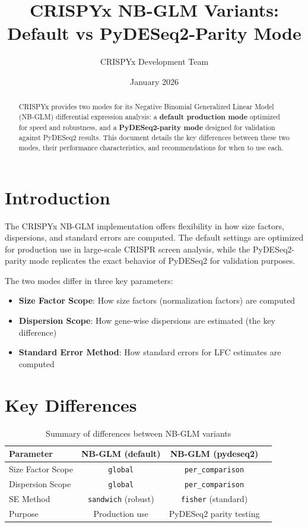 \documentclass{article}
\title{CRISPYx NB-GLM Variants: Default vs PyDESeq2-Parity Mode}
\author{CRISPYx Development Team}
\date{January 2026}
\begin{document}
\maketitle

\begin{abstract}
CRISPYx provides two modes for its Negative Binomial Generalized Linear Model (NB-GLM) differential expression analysis: a \textbf{default production mode} optimized for speed and robustness, and a \textbf{PyDESeq2-parity mode} designed for validation against PyDESeq2 results. This document details the key differences between these two modes, their performance characteristics, and recommendations for when to use each.
\end{abstract}

\section{Introduction}

The CRISPYx NB-GLM implementation offers flexibility in how size factors, dispersions, and standard errors are computed. The default settings are optimized for production use in large-scale CRISPR screen analysis, while the PyDESeq2-parity mode replicates the exact behavior of PyDESeq2 for validation purposes.

The two modes differ in three key parameters:
\begin{itemize}
    \item \textbf{Size Factor Scope}: How size factors (normalization factors) are computed
    \item \textbf{Dispersion Scope}: How gene-wise dispersions are estimated (the key difference)
    \item \textbf{Standard Error Method}: How standard errors for LFC estimates are computed
\end{itemize}

\section{Key Differences}

\begin{table}[h]
\centering
\caption{Summary of differences between NB-GLM variants}
\label{tab:summary}
\begin{tabular}{lccc}
\toprule
\textbf{Parameter} & \textbf{NB-GLM (default)} & \textbf{NB-GLM (pydeseq2)} \\
\midrule
Size Factor Scope & \texttt{global} & \texttt{per\_comparison} \\
Dispersion Scope & \texttt{global} & \texttt{per\_comparison} \\
SE Method & \texttt{sandwich} (robust) & \texttt{fisher} (standard) \\
Purpose & Production use & PyDESeq2 parity testing \\
\bottomrule
\end{tabular}
\end{table}
\end{document}
